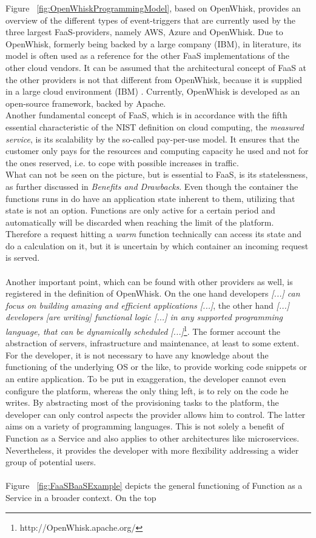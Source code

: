 \documentclass[11pt]{article}
\begin{document}
Figure ~\ref{fig:OpenWhiskProgrammingModel}, based on OpenWhisk, provides an overview of the different types of event-triggers that are currently used by the three largest FaaS-providers, namely AWS, Azure and OpenWhisk. Due to OpenWhisk, formerly being backed by a large company (IBM), in literature, its model is often used as a reference for the other FaaS implementations of the other cloud vendors. It can be assumed that the architectural concept of FaaS at the other providers is not that different from OpenWhisk, because it is supplied in a large cloud environment (IBM) \cite{van2019spec}. Currently, OpenWhisk is developed as an open-source framework, backed by Apache. \\ Another fundamental concept of FaaS, which is in accordance with the fifth essential characteristic of the NIST definition on cloud computing, the \textit{measured service}, is its scalability by the so-called pay-per-use model. It ensures that the customer only pays for the resources and computing capacity he used and not for the ones reserved, i.e. to cope with possible increases in traffic.\\ What can not be seen on the picture, but is essential to FaaS, is its statelessness, as further discussed in \textit{Benefits and Drawbacks}. Even though the container the functions runs in do have an application state inherent to them, utilizing that state is not an option. Functions are only active for a certain period and automatically will be discarded when reaching the limit of the platform. Therefore a request hitting a \textit{warm} function technically can access its state and do a calculation on it, but it is uncertain by which container an incoming request is served.\\\\ Another important point, which can be found with other providers as well, is registered in the definition of OpenWhisk. On the one hand developers \glqq \textit{[...] can focus on building amazing and efficient applications [...]}\grqq{}, the other hand \glqq \textit{[...] developers [are writing] functional logic [...] in any supported programming language, that can be dynamically scheduled [...]}\grqq{}\footnote{http://OpenWhisk.apache.org/}. The former account the abstraction of servers, infrastructure and maintenance, at least to some extent. For the developer, it is not necessary to have any knowledge about the functioning of the underlying OS or the like, to provide working code snippets or an entire application. To be put in exaggeration, the developer cannot even configure the platform, whereas the only thing left, is to rely on the code he writes. By abstracting most of the provisioning tasks to the platform, the developer can only control aspects the provider allows him to control. The latter aims on a variety of programming languages. This is not solely a benefit of Function as a Service and also applies to other architectures like microservices. Nevertheless, it provides the developer with more flexibility addressing a wider group of potential users.\\\\ Figure ~\ref{fig:FaaSBaaSExample} depicts the general functioning of Function as a Service in a broader context. On the top 
\end{document}
